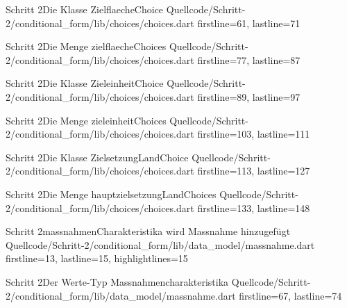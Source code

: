 \begin{alexlisting}{Schritt 2}{Die Klasse ZielflaecheChoice}
  {Quellcode/Schritt-2/conditional_form/lib/choices/choices.dart}
  {firstline=61, lastline=71}
  \label{lst:Schritt2KlasseZielflaecheChoice}
\end{alexlisting}

\begin{alexlisting}{Schritt 2}{Die Menge zielflaecheChoices}
  {Quellcode/Schritt-2/conditional_form/lib/choices/choices.dart}
  {firstline=77, lastline=87}
  \label{lst:Schritt2DieMengeZielflaecheChoices}
\end{alexlisting}

\begin{alexlisting}{Schritt 2}{Die Klasse ZieleinheitChoice}
  {Quellcode/Schritt-2/conditional_form/lib/choices/choices.dart}
  {firstline=89, lastline=97}
  \label{lst:Schritt2KlasseZieleinheitChoice}
\end{alexlisting}

\begin{alexlisting}{Schritt 2}{Die Menge zieleinheitChoices}
  {Quellcode/Schritt-2/conditional_form/lib/choices/choices.dart}
  {firstline=103, lastline=111}
  \label{lst:Schritt2DieMengeZieleinheitChoices}
\end{alexlisting}
  

\begin{alexlisting}{Schritt 2}{Die Klasse ZielsetzungLandChoice}
  {Quellcode/Schritt-2/conditional_form/lib/choices/choices.dart}
  {firstline=113, lastline=127}
  \label{lst:Schritt2KlasseZielsetzungLandChoice}
\end{alexlisting}
 
\begin{alexlisting}{Schritt 2}{Die Menge hauptzielsetzungLandChoices}
  {Quellcode/Schritt-2/conditional_form/lib/choices/choices.dart}
  {firstline=133, lastline=148}
  \label{lst:Schritt2DieMengeHauptzielsetzungLandChoices}
\end{alexlisting}


\begin{alexlisting}{Schritt 2}{massnahmenCharakteristika wird Massnahme hinzugefügt}
  {Quellcode/Schritt-2/conditional_form/lib/data_model/massnahme.dart}
  {firstline=13, lastline=15, highlightlines={15}}
  \label{lst:Schritt2massnahmenCharakteristika wird Massnahme hinzugefügt}
\end{alexlisting}


\begin{alexlisting}{Schritt 2}{Der Werte-Typ Massnahmencharakteristika}
  {Quellcode/Schritt-2/conditional_form/lib/data_model/massnahme.dart}
  {firstline=67, lastline=74}
  \label{lst:Schritt2WerteTypMassnahmencharakteristika}
\end{alexlisting}

